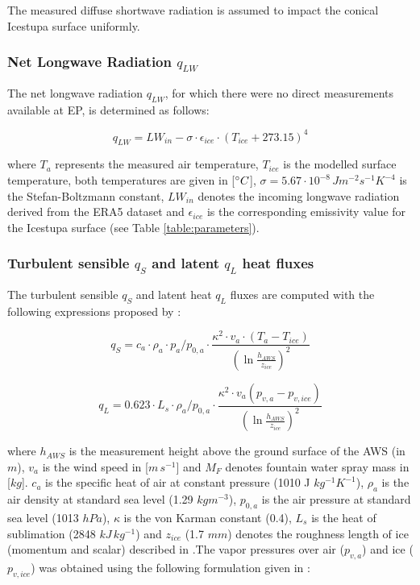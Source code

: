 \documentclass[utf8]{frontiersSCNS} %
\begin{document}
The measured diffuse shortwave radiation is assumed to impact the conical Icestupa surface uniformly. 

\subsubsection{Net Longwave Radiation $q_{LW}$}

The net longwave radiation $q_{LW}$, for which there were no direct measurements available at EP, is
determined as follows:

\begin{equation} q_{LW}= LW_{in}-\sigma \cdot \epsilon_{ice} \cdot {(T_{ice}+ 273.15)}^4
\label{eqn:LW} \end{equation}

where $T_a$ represents the measured air temperature, $T_{ice}$ is the modelled surface temperature, both temperatures
are given in [$\degree C$], $\sigma=5.67 \cdot 10^{−8}\,Jm^{-2}s^{-1}K^{-4}$ is the Stefan-Boltzmann constant,
$LW_{in}$
denotes the incoming longwave radiation derived from the ERA5 dataset and $\epsilon_{ice}$ is the corresponding
emissivity value for the Icestupa surface (see Table \ref{table:parameters}).

\subsubsection{Turbulent sensible $q_{S}$ and latent $q_{L}$ heat fluxes }

The turbulent sensible $q_{S}$ and latent heat $q_{L}$ fluxes are computed with the following expressions proposed by
\cite{Garratt_1992}:

\begin{equation} q_{S}=c_{a} \cdot \rho_{a} \cdot p_{a}/p_{0,a} \cdot \frac{\kappa^2 \cdot v_a \cdot
(T_a-T_{ice})}{{(\ln{\frac{h_{AWS}}{z_{ice}}})}^2} \label{eqn:qs} \end{equation}

\begin{equation} q_{L}=0.623 \cdot L_s \cdot \rho_{a}/p_{0,a} \cdot \frac{\kappa^2 \cdot
         v_a(p_{v,a}-p_{v,ice})}{{(\ln{\frac{h_{AWS}}{z_{ice}}})}^2}
\end{equation}

where $h_{AWS}$ is the measurement height above the ground surface of the AWS (in $m$), $v_a$ is the wind speed in
[$m\,s^{-1}$] and $M_{F}$ denotes fountain water spray mass in [$kg$]. $c_a$ is the specific heat of air at constant
pressure (1010 J $kg^{-1} K^{-1}$), $\rho_{a}$ is the air density at standard sea level (1.29 $kg m^{-3}$), $p_{0,a}$
is the air pressure at standard sea level (1013 $hPa$), $\kappa$ is the von Karman constant (0.4), $L_s$ is the heat
of sublimation (2848 $kJ\, kg^{-1}$) and $z_{ice}$ (1.7 $mm$) denotes the roughness length of ice (momentum and
scalar) described in \citep{Garratt_1992}.The vapor pressures over air ($p_{v,a}$) and ice ($p_{v,ice}$) was obtained using the following formulation given in \cite{WMO_2018}:
\end{document}
